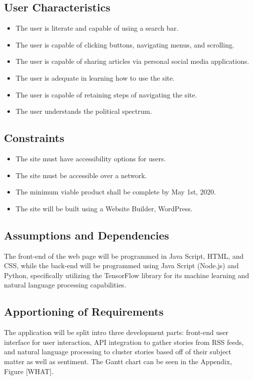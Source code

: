 \documentclass[onecolumn, draftclsnofoot,10pt, compsoc]{IEEEtran}
\begin{document}
\subsection{User Characteristics}
\begin  {itemize}
\item The user is literate and capable of using a search bar.
\item The user is capable of clicking buttons, navigating menus, and scrolling.
\item The user is capable of sharing articles via personal social media applications.
\item The user is adequate in learning how to use the site.
\item The user is capable of retaining steps of navigating the site.
\item The user understands the political spectrum.
\end {itemize}

\subsection{Constraints}
\begin {itemize}
\item The site must have accessibility options for users. 
\item The site must be accessible over a network.
\item The minimum viable product shall be complete by May 1st, 2020.
\item The site will be built using a Website Builder, WordPress.
\end {itemize}

\subsection{Assumptions and Dependencies}
The front-end of the web page will be programmed in Java Script, HTML, and CSS, while the back-end will be programmed using Java Script (Node.js) and Python, specifically utilizing the TensorFlow library for its machine learning and natural language processing capabilities.


\subsection{Apportioning of Requirements}
The application will be split intro three development parts: front-end user interface for user interaction, API integration to gather stories from RSS feeds, and natural language processing to cluster stories based off of their subject matter as well as sentiment.
    The Gantt chart can be seen in the Appendix, Figure [WHAT].
\end{document}

